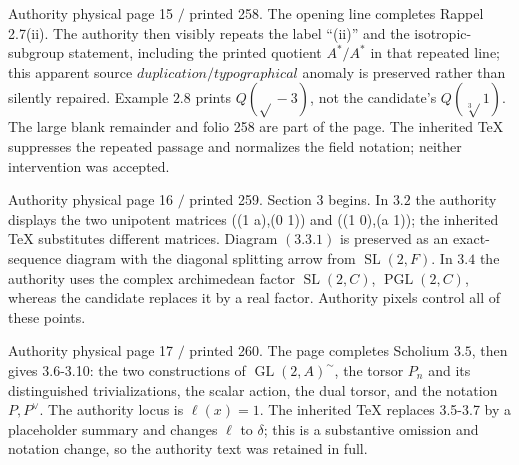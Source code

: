 \documentclass[10pt,a4paper]{article}
\begin{document}
\clearpage
{}
\label{d035-physical-015}
\par Authority physical page 15 $/$ printed 258. The opening line completes Rappel 2.7(ii). The authority then visibly repeats the label ``(ii)'' and the isotropic-subgroup statement, including the printed quotient $A^*/A^*$ in that repeated line; this apparent source $duplication/typographical$ anomaly is preserved rather than silently repaired. Example $2.8$ prints $Q(\sqrt{}-3)$, not the candidate's $Q(\sqrt[3]{}1)$. The large blank remainder and folio 258 are part of the page. The inherited TeX suppresses the repeated passage and normalizes the field notation; neither intervention was accepted.\par

\clearpage
{}
\label{d035-physical-016}
\par Authority physical page 16 $/$ printed 259. Section 3 begins. In $3.2$ the authority displays the two unipotent matrices ((1 a),(0 1)) and ((1 0),(a 1)); the inherited TeX substitutes different matrices. Diagram $(3.3.1)$ is preserved as an exact-sequence diagram with the diagonal splitting arrow from $\operatorname{SL}(2,F)$. In $3.4$ the authority uses the complex archimedean factor $\operatorname{SL}(2,C)$, $\operatorname{PGL}(2,C)$, whereas the candidate replaces it by a real factor. Authority pixels control all of these points.\par

\clearpage
{}
\label{d035-physical-017}
\par Authority physical page 17 $/$ printed 260. The page completes Scholium $3.5$, then gives 3.6-3.10: the two constructions of $\operatorname{GL}(2,A)^\sim$, the torsor $P_n$ and its distinguished trivializations, the scalar action, the dual torsor, and the notation $P,P^\vee{}$. The authority locus is $\ell{}(x)=1$. The inherited TeX replaces 3.5-3.7 by a placeholder summary and changes $\ell{}$ to $\delta{}$; this is a substantive omission and notation change, so the authority text was retained in full.\par
\end{document}
